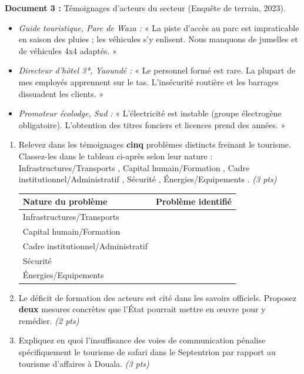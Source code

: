 \documentclass[11pt]{article}
\begin{document}
\begin{exercice}
\textbf{Document 3 :} Témoignages d'acteurs du secteur (Enquête de terrain, 2023).
\begin{itemize}
    \item \textit{Guide touristique, Parc de Waza :} « La piste d'accès au parc est impraticable en saison des pluies ; les véhicules s'y enlisent. Nous manquons de jumelles et de véhicules 4x4 adaptés. »
    \item \textit{Directeur d'hôtel 3*, Yaoundé :} « Le personnel formé est rare. La plupart de mes employés apprennent sur le tas. L'insécurité routière et les barrages dissuadent les clients. »
    \item \textit{Promoteur écolodge, Sud :} « L'électricité est instable (groupe électrogène obligatoire). L'obtention des titres fonciers et licences prend des années. »
\end{itemize}

\begin{enumerate}
    \item Relevez dans les témoignages \textbf{cinq} problèmes distincts freinant le tourisme. Classez-les dans le tableau ci-après selon leur nature : \og Infrastructures/Transports \fg{}, \og Capital humain/Formation \fg{}, \og Cadre institutionnel/Administratif \fg{}, \og Sécurité \fg{}, \og Énergies/Equipements \fg{}. \textit{(3 pts)}
    \begin{center}
    \begin{tabular}{|l|l|}
    \hline
    \textbf{Nature du problème} & \textbf{Problème identifié} \\ \hline
    Infrastructures/Transports & \\ \hline
    Capital humain/Formation & \\ \hline
    Cadre institutionnel/Administratif & \\ \hline
    Sécurité & \\ \hline
    Énergies/Equipements & \\ \hline
    \end{tabular}
    \end{center}
    \item Le \og déficit de formation des acteurs \fg{} est cité dans les savoirs officiels. Proposez \textbf{deux} mesures concrètes que l'État pourrait mettre en œuvre pour y remédier. \textit{(2 pts)}
    \item Expliquez en quoi l'insuffisance des \og voies de communication \fg{} pénalise spécifiquement le tourisme de safari dans le Septentrion par rapport au tourisme d'affaires à Douala. \textit{(3 pts)}
\end{enumerate}
\end{exercice}
\end{document}
